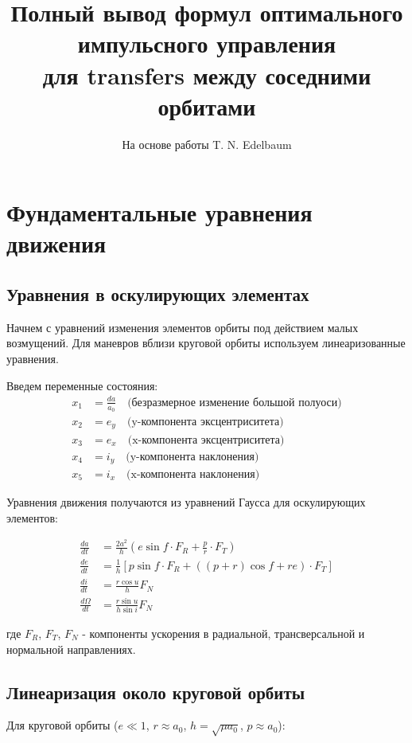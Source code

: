 \documentclass[12pt]{article}
\title{Полный вывод формул оптимального импульсного управления \\ для transfers между соседними орбитами}
\author{На основе работы T. N. Edelbaum}
\date{}
\begin{document}
\maketitle

\section{Фундаментальные уравнения движения}

\subsection{Уравнения в оскулирующих элементах}

Начнем с уравнений изменения элементов орбиты под действием малых возмущений. Для маневров вблизи круговой орбиты используем линеаризованные уравнения.

Введем переменные состояния:
\begin{align*}
x_1 &= \frac{da}{a_0} \quad \text{(безразмерное изменение большой полуоси)} \\
x_2 &= e_y \quad \text{(y-компонента эксцентриситета)} \\
x_3 &= e_x \quad \text{(x-компонента эксцентриситета)} \\
x_4 &= i_y \quad \text{(y-компонента наклонения)} \\
x_5 &= i_x \quad \text{(x-компонента наклонения)}
\end{align*}

Уравнения движения получаются из уравнений Гаусса для оскулирующих элементов:

\begin{align}
\frac{da}{dt} &= \frac{2a^2}{h} \left(e \sin f \cdot F_R + \frac{p}{r} \cdot F_T\right) \\
\frac{de}{dt} &= \frac{1}{h} \left[p \sin f \cdot F_R + ((p+r)\cos f + re) \cdot F_T\right] \\
\frac{di}{dt} &= \frac{r \cos u}{h} F_N \\
\frac{d\Omega}{dt} &= \frac{r \sin u}{h \sin i} F_N
\end{align}

где $F_R$, $F_T$, $F_N$ - компоненты ускорения в радиальной, трансверсальной и нормальной направлениях.

\subsection{Линеаризация около круговой орбиты}

Для круговой орбиты ($e \ll 1$, $r \approx a_0$, $h = \sqrt{\mu a_0}$, $p \approx a_0$):
\end{document}
